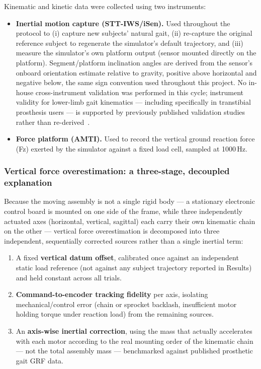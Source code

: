 \documentclass[times,sagev]{sagej}
\begin{document}
Kinematic and kinetic data were collected using two instruments:

\begin{itemize}
\item \textbf{Inertial motion capture (STT-IWS/iSen).} Used throughout
the protocol to (i) capture new subjects' natural gait, (ii) re-capture
the original reference subject to regenerate the simulator's default
trajectory, and (iii) measure the simulator's own platform output
(sensor mounted directly on the platform). Segment/platform inclination
angles are derived from the sensor's onboard orientation estimate
relative to gravity, positive above horizontal and negative below, the
same sign convention used throughout this project. No in-house
cross-instrument validation was performed in this cycle; instrument
validity for lower-limb gait kinematics --- including specifically in
transtibial prosthesis users --- is supported by previously published
validation studies rather than re-derived~\cite{PENDIENTE_iSen_transtibial}.
\item \textbf{Force platform (AMTI).} Used to record the vertical
ground reaction force (Fz) exerted by the simulator against a fixed
load cell, sampled at 1000\,Hz.
\end{itemize}

\subsubsection{Vertical force overestimation: a three-stage, decoupled explanation}

Because the moving assembly is not a single rigid body --- a stationary
electronic control board is mounted on one side of the frame, while
three independently actuated axes (horizontal, vertical, sagittal) each
carry their own kinematic chain on the other --- vertical force
overestimation is decomposed into three independent, sequentially
corrected sources rather than a single inertial term:

\begin{enumerate}
\item A fixed \textbf{vertical datum offset}, calibrated once against
an independent static load reference (not against any subject
trajectory reported in Results) and held constant across all trials.
\item \textbf{Command-to-encoder tracking fidelity} per axis, isolating
mechanical/control error (chain or sprocket backlash, insufficient
motor holding torque under reaction load) from the remaining sources.
\item An \textbf{axis-wise inertial correction}, using the mass that
actually accelerates with each motor according to the real mounting
order of the kinematic chain --- not the total assembly mass ---
benchmarked against published prosthetic gait GRF data.
\end{enumerate}
\end{document}
